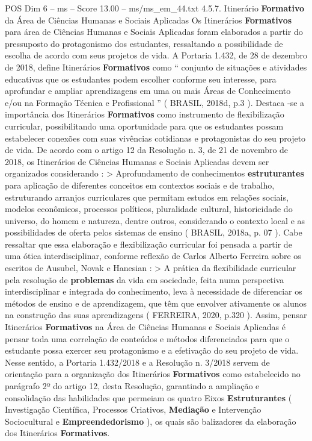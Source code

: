 \begin{textsample}{POS Dim 6 – ms – Score 13.00 – ms/ms\_em\_44.txt}  \label{ex:f6_pos_051}
4.5.7.
Itinerário \textbf{Formativo} da Área de Ciências Humanas e Sociais Aplicadas Os Itinerários \textbf{Formativos} para área de Ciências Humanas e Sociais Aplicadas foram elaborados a partir do pressuposto do protagonismo dos estudantes, ressaltando a possibilidade de escolha de acordo com seus projetos de vida.
A Portaria 1.432, de 28 de dezembro de 2018, define Itinerários \textbf{Formativos} como “ conjunto de situações e atividades educativas que os estudantes podem escolher conforme seu interesse, para aprofundar e ampliar aprendizagens em uma ou mais Áreas de Conhecimento e/ou na Formação Técnica e Profissional ” ( BRASIL, 2018d, p.3 ).
Destaca -se a importância dos Itinerários \textbf{Formativos} como instrumento de flexibilização curricular, possibilitando uma oportunidade para que os estudantes possam estabelecer conexões com suas vivências cotidianas e protagonistas do seu projeto de vida.
De acordo com o artigo 12 da Resolução n. 3, de 21 de novembro de 2018, os Itinerários de Ciências Humanas e Sociais Aplicadas devem ser organizados considerando : > Aprofundamento de conhecimentos \textbf{estruturantes} para aplicação de diferentes conceitos em contextos sociais e de trabalho, estruturando arranjos curriculares que permitam estudos em relações sociais, modelos econômicos, processos políticos, pluralidade cultural, historicidade do universo, do homem e natureza, dentre outros, considerando o contexto local e as possibilidades de oferta pelos sistemas de ensino ( BRASIL, 2018a, p. 07 ).
Cabe ressaltar que essa elaboração e flexibilização curricular foi pensada a partir de uma ótica interdisciplinar, conforme reflexão de Carlos Alberto Ferreira sobre os escritos de Ausubel, Novak e Hanesian : > A prática da flexibilidade curricular pela resolução de \textbf{problemas} da vida em sociedade, feita numa perspectiva interdisciplinar e integrada do conhecimento, leva à necessidade de diferenciar os métodos de ensino e de aprendizagem, que têm que envolver ativamente os alunos na construção das suas aprendizagens ( FERREIRA, 2020, p.320 ).
Assim, pensar Itinerários \textbf{Formativos} na Área de Ciências Humanas e Sociais Aplicadas é pensar toda uma correlação de conteúdos e métodos diferenciados para que o estudante possa exercer seu protagonismo e a efetivação do seu projeto de vida.
Nesse sentido, a Portaria 1.432/2018 e a Resolução n. 3/2018 servem de orientação para a organização dos Itinerários \textbf{Formativos} como estabelecido no parágrafo 2º do artigo 12, desta Resolução, garantindo a ampliação e consolidação das habilidades que permeiam os quatro Eixos \textbf{Estruturantes} ( Investigação Científica, Processos Criativos, \textbf{Mediação} e Intervenção Sociocultural e \textbf{Empreendedorismo} ), os quais são balizadores da elaboração dos Itinerários \textbf{Formativos}.

\end{textsample}
